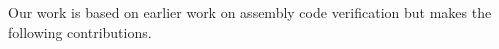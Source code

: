 
Our work is based on earlier work on assembly code
verification but makes the following contributions.



